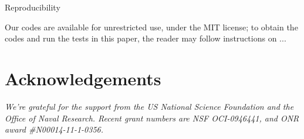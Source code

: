 \documentclass[10pt,twocolumn,twoside]{article}
\newlength{\up}
\begin{document}
\pagestyle{fancy}



\lettrine{\textcolor{dropped}{R}}{}eproducibility



\vspace{2cm}

Our codes are available for unrestricted use, under the MIT license; to obtain the codes and run the tests in this paper, the reader may follow instructions on ...



\section*{Acknowledgements}
\vspace{\up}

{\sf \emph{We're grateful for the support from the US National Science Foundation and the Office of Naval Research. Recent grant numbers are NSF OCI-0946441, and ONR award \#N00014-11-1-0356.}

\bigskip

}




\vspace{1cm}
\end{document}
